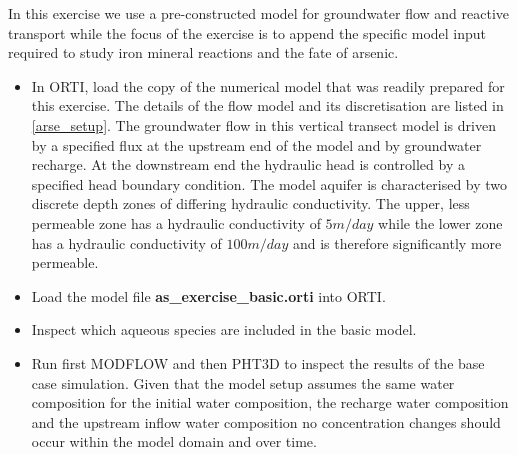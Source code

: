 In this exercise we use a pre-constructed model for groundwater flow and reactive transport 
while the focus of the exercise is to append the specific model input required to
study iron mineral reactions and the fate of arsenic.

\begin{itemize}

\item In ORTI, load the copy of the numerical model that was readily prepared 
for this exercise. The details of the flow model 
and its discretisation are listed in \ref{arse_setup}.
The groundwater flow in this vertical transect model is driven by a specified flux at the 
upstream end of the model and by groundwater recharge. At the downstream end the hydraulic head is controlled by a specified head boundary condition.
The model aquifer is characterised by two discrete
depth zones of differing hydraulic conductivity. 
The upper, less permeable zone has a hydraulic conductivity of $5 m/day$ while the lower zone has a hydraulic conductivity of $100 m/day$
and is therefore significantly more permeable.

\item Load the model file {\color{red} \textbf{as\_exercise\_basic.orti}} into ORTI. 

\item Inspect which aqueous species are included in the basic model. 

\item Run first MODFLOW and then PHT3D to inspect the results of the base case simulation. Given that the model setup assumes the same water composition for the initial water composition, the recharge water composition and the upstream inflow water composition no concentration changes should  occur within the model domain and over time. 
 

\end{itemize}

